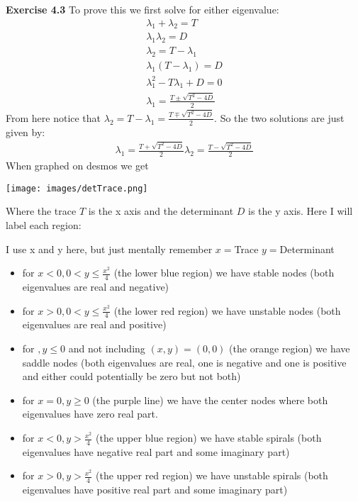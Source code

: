 \documentclass[12pt]{article}
\newenvironment{exercise}[1]{\vspace{.1in}\noindent\textbf{Exercise #1 \hspace{.05em}}}{}
\theoremstyle{definition}
\theoremstyle{remark}
\begin{document}
\begin{exercise}{4.3}
	To prove this we first solve for either eigenvalue:
	\begin{align}
		\lambda_1+\lambda_2=T      \\
		\lambda_1 \lambda_2=D      \\
		\lambda_2=T-\lambda_1      \\
		\lambda_1(T-\lambda_1)=D   \\
		\lambda_1^2-T\lambda_1+D=0 \\
		\lambda_1=\frac{T\pm\sqrt{T^2-4D}}{2}
	\end{align}
	From here notice that $\lambda_2=T-\lambda_1=\frac{T\mp\sqrt{T^2-4D}}{2}$. So the two solutions are just given by:
	\begin{align}
		\lambda_{1}=\frac{T+ \sqrt{T^2-4D}}{2}
		\lambda_{2}=\frac{T- \sqrt{T^2-4D}}{2}
	\end{align}
	When graphed on desmos we get

	\texttt{[image: images/detTrace.png]}

	Where the trace $T$ is the x axis and the determinant $D$ is the y axis. Here I will label each region:

	I use x and y here, but just mentally remember $x=$Trace $y=$Determinant
	\begin{itemize}
		\item for $x<0,0<y\leq \frac{x^2}{4}$ (the lower blue region) we have stable nodes (both eigenvalues are real and negative)
		\item for $x>0,0<y\leq \frac{x^2}{4}$ (the lower red region) we have unstable nodes (both eigenvalues are real and positive)
		\item for $,y\leq 0$ and not including $(x,y)=(0,0)$ (the orange region) we have saddle nodes (both eigenvalues are real, one is negative and one is positive and either could potentially be zero but not both)
		\item for $x=0,y\geq 0$ (the purple line) we have the center nodes where both eigenvalues have zero real part.
		\item for $x<0,y>\frac{x^2}{4}$ (the upper blue region) we have stable spirals (both eigenvalues have negative real part and some imaginary part)
		\item for $x>0,y>\frac{x^2}{4}$ (the upper red region) we have unstable spirals (both eigenvalues have positive real part and some imaginary part)
	\end{itemize}

\end{exercise}
\end{document}
